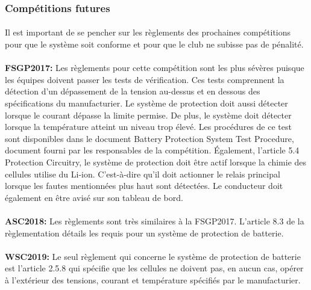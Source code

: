 	\subsubsection{Compétitions futures}
	
		\paragraph{}
		Il est important de se pencher sur les règlements des prochaines compétitions pour que le système soit conforme et pour que le club ne subisse pas de pénalité.
	
		\paragraph{}   \textbf{FSGP2017:}
		Les règlements pour cette compétition sont les plus sévères puisque les équipes doivent passer les tests de vérification. Ces tests comprennent la détection d'un dépassement de la tension au-dessus et en dessous des spécifications du manufacturier. Le système de protection doit aussi détecter lorsque le courant dépasse la limite permise. De plus, le système doit détecter lorsque la température atteint un niveau trop élevé. Les procédures de ce test sont disponibles dans le document Battery Protection System Test Procedure, document fourni par les responsables de la compétition. Également, l'article 5.4 Protection Circuitry, le système de protection doit être actif lorsque la chimie des cellules utilise du Li-ion. C'est-à-dire qu'il doit actionner le relais principal lorsque les fautes mentionnées plus haut sont détectées. Le conducteur doit également en être avisé sur son tableau de bord. \cite{reg_fsgp2017}
		
		\paragraph{}   \textbf{ASC2018:}
		Les règlements sont très similaires à la FSGP2017. L'article 8.3 de la règlementation détails les requis pour un système de protection de batterie. \cite{reg_asc2018}
		
		\paragraph{}   \textbf{WSC2019:}
		Le seul règlement qui concerne le système de protection de batterie est l'article 2.5.8 qui spécifie que les cellules ne doivent pas, en aucun cas, opérer à l'extérieur des tensions, courant et température spécifiés par le manufacturier. \cite{reg_wsc2017}